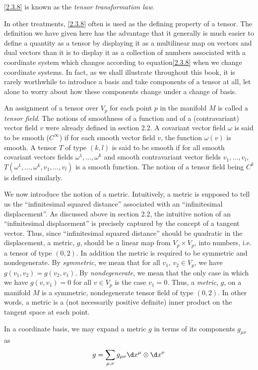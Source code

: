 \eqref{2.3.8} is known as the \emph{tensor transformation law}.

In other treatments, \eqref{2.3.8} often is used as the defining property of a tensor. The definition we have given here has the advantage that it generally is much easier to define a quantity as a tensor by displaying it as a multilinear map on vectors and dual vectors than it is to display it as a collection of numbers associated with a coordinate system which changes according to equation\eqref{2.3.8} when we change coordinate systems. In fact, as we shall illustrate throughout this book, it is rarely worthwhile to introduce a basis and take components of a tensor at all, let alone to worry about how these components change under a change of basis.

An assignment of a tensor over $V_p$ for each point $p$ in the manifold $M$ is called a \emph{tensor field}. The notions of smoothness of a function and of a (contravariant) vector field $v$ were already defined in section 2.2. A covariant vector field $\omega$ is said to be smooth ($C^\infty$) if for each smooth vector field $v$, the function $\omega(v)$ is smooth. A tensor $T$ of type $(k, l)$ is said to be smooth if for all smooth covariant vectors fields $\omega^1,\ldots,\omega^k$ and smooth contravariant vector fields $v_1,\ldots,v_l$, $T(\omega^1,\ldots,\omega^k,v_1,\ldots,v_l)$ is a smooth function. The notion of a tensor field being $C^k$ is defined similarly.

We now introduce the notion of a metric. Intuitively, a metric is supposed to tell us the ``infinitesimal squared distance'' associated with an ``infinitesimal displacement''. As discussed above in section 2.2, the intuitive notion of an ``infinitesimal displacement'' is precisely captured by the concept of a tangent vector. Thus, since ``infinitesimal squared distance'' should be quadratic in the displacement, a metric, $g$, should be a linear map from $V_p\times V_p$, into numbers, i.e. a tensor of type $(0,2)$. In addition the metric is required to be symmetric and nondegenerate. By \emph{symmetric}, we mean that for all $v_1$, $v_2\in V_p$, we have $g(v_1,v_2)=g(v_2,v_1)$. By \emph{nondegenerate}, we mean that the only case in which we have $g(v,v_1)=0$ for all $v\in V_p$ is the case $v_1=0$. Thus, a \emph{metric}, $g$, on a manifold $M$ is a symmetric, nondegenerate tensor field of type $(0,2)$. In other words, a metric is a (not necessarily positive definite) inner product on the tangent space at each point.

In a coordinate basis, we may expand a metric $g$ in terms of its components $g_{\mu\nu}$ as
\begin{equation}
    g=\sum_{\mu,\nu}g_{\mu\nu}\d x^\mu\otimes\d x^\nu
    \label{2.3.9}
\end{equation}

